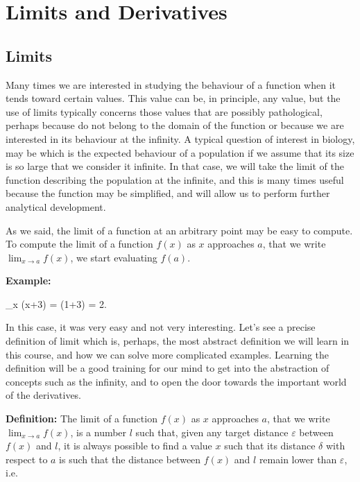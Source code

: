 

\section{Limits and Derivatives}\label{diff}


\subsection{Limits}

Many times we are interested in studying the behaviour of a function when
it tends toward certain values. This value can be, in principle, any value, 
but the use of limits typically concerns those values that are possibly pathological, perhaps because do not belong to the domain of the function or because we are interested
in its behaviour at the infinity. A typical question of interest in biology, may be
which is the expected behaviour of a population if we assume that its size is so large
that we consider it infinite. In that case, we will take the limit of the function
describing the population at the infinite, and this is many times useful because
the function may be simplified, and will allow us to perform further analytical development.

As we said, the limit of a function at an arbitrary point may be easy to compute. To compute
the limit of a function $f(x)$ as $x$ approaches $a$, that we write $\lim_{x\rightarrow a}f(x)$,
we start evaluating $f(a)$.

{\bf Example:} 

\bnn
 \lim_{x} (x+3) = (1+3) = 2.
\enn

In this case, it was very easy and not very interesting. Let's see a precise 
definition of limit which is, perhaps, the most abstract definition we will learn in this course, and how we can solve more complicated examples. Learning the definition will be a good training for our mind to get into the abstraction of concepts such as the infinity, and to open
the door towards the important world of the derivatives. 

{\bf Definition:} The limit of a function $f(x)$ as $x$ approaches $a$, that we write $\lim_{x\rightarrow a}f(x)$,
is a number $l$ such that, given any target distance $\varepsilon$ between $f(x)$ and $l$, it is always possible to find a value $x$ such that its distance $\delta$ with respect to $a$ is such that the distance between $f(x)$ and $l$ remain lower than $\varepsilon$, i.e.

